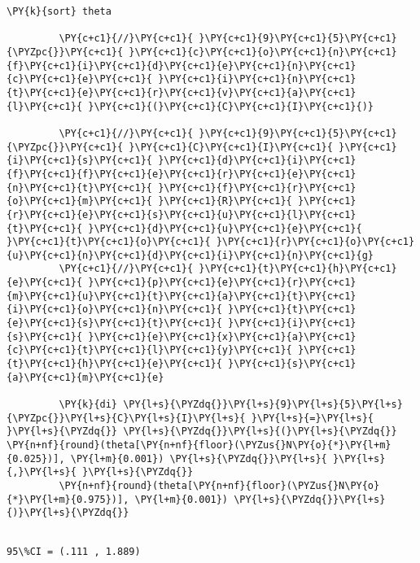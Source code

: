 \documentclass[11pt,notitlepage]{article}\usepackage[]{graphicx}\usepackage[]{color}
\makeatletter
\newenvironment{kframe}{%
 \def\at@end@of@kframe{}%
 \ifinner\ifhmode%
  \def\at@end@of@kframe{\end{minipage}}%
  \begin{minipage}{\columnwidth}%
 \fi\fi%
 \def\FrameCommand##1{\hskip\@totalleftmargin \hskip-\fboxsep
 \colorbox{shadecolor}{##1}\hskip-\fboxsep
     \hskip-\linewidth \hskip-\@totalleftmargin \hskip\columnwidth}%
 \MakeFramed {\advance\hsize-\width
   \@totalleftmargin\z@ \linewidth\hsize
   \@setminipage}}%
 {\par\unskip\endMakeFramed%
 \at@end@of@kframe}
\newenvironment{knitrout}{}{} %
\makeatother
\begin{document}
\begin{enumerate}[a)]
\begin{knitrout}
\begin{kframe}
\begin{Verbatim}[commandchars=\\\{\}]
         \PY{k}{sort} theta
         
         \PY{c+c1}{//}\PY{c+c1}{ }\PY{c+c1}{9}\PY{c+c1}{5}\PY{c+c1}{\PYZpc{}}\PY{c+c1}{ }\PY{c+c1}{c}\PY{c+c1}{o}\PY{c+c1}{n}\PY{c+c1}{f}\PY{c+c1}{i}\PY{c+c1}{d}\PY{c+c1}{e}\PY{c+c1}{n}\PY{c+c1}{c}\PY{c+c1}{e}\PY{c+c1}{ }\PY{c+c1}{i}\PY{c+c1}{n}\PY{c+c1}{t}\PY{c+c1}{e}\PY{c+c1}{r}\PY{c+c1}{v}\PY{c+c1}{a}\PY{c+c1}{l}\PY{c+c1}{ }\PY{c+c1}{(}\PY{c+c1}{C}\PY{c+c1}{I}\PY{c+c1}{)}
         
         \PY{c+c1}{//}\PY{c+c1}{ }\PY{c+c1}{9}\PY{c+c1}{5}\PY{c+c1}{\PYZpc{}}\PY{c+c1}{ }\PY{c+c1}{C}\PY{c+c1}{I}\PY{c+c1}{ }\PY{c+c1}{i}\PY{c+c1}{s}\PY{c+c1}{ }\PY{c+c1}{d}\PY{c+c1}{i}\PY{c+c1}{f}\PY{c+c1}{f}\PY{c+c1}{e}\PY{c+c1}{r}\PY{c+c1}{e}\PY{c+c1}{n}\PY{c+c1}{t}\PY{c+c1}{ }\PY{c+c1}{f}\PY{c+c1}{r}\PY{c+c1}{o}\PY{c+c1}{m}\PY{c+c1}{ }\PY{c+c1}{R}\PY{c+c1}{ }\PY{c+c1}{r}\PY{c+c1}{e}\PY{c+c1}{s}\PY{c+c1}{u}\PY{c+c1}{l}\PY{c+c1}{t}\PY{c+c1}{ }\PY{c+c1}{d}\PY{c+c1}{u}\PY{c+c1}{e}\PY{c+c1}{ }\PY{c+c1}{t}\PY{c+c1}{o}\PY{c+c1}{ }\PY{c+c1}{r}\PY{c+c1}{o}\PY{c+c1}{u}\PY{c+c1}{n}\PY{c+c1}{d}\PY{c+c1}{i}\PY{c+c1}{n}\PY{c+c1}{g}
         \PY{c+c1}{//}\PY{c+c1}{ }\PY{c+c1}{t}\PY{c+c1}{h}\PY{c+c1}{e}\PY{c+c1}{ }\PY{c+c1}{p}\PY{c+c1}{e}\PY{c+c1}{r}\PY{c+c1}{m}\PY{c+c1}{u}\PY{c+c1}{t}\PY{c+c1}{a}\PY{c+c1}{t}\PY{c+c1}{i}\PY{c+c1}{o}\PY{c+c1}{n}\PY{c+c1}{ }\PY{c+c1}{t}\PY{c+c1}{e}\PY{c+c1}{s}\PY{c+c1}{t}\PY{c+c1}{ }\PY{c+c1}{i}\PY{c+c1}{s}\PY{c+c1}{ }\PY{c+c1}{e}\PY{c+c1}{x}\PY{c+c1}{a}\PY{c+c1}{c}\PY{c+c1}{t}\PY{c+c1}{l}\PY{c+c1}{y}\PY{c+c1}{ }\PY{c+c1}{t}\PY{c+c1}{h}\PY{c+c1}{e}\PY{c+c1}{ }\PY{c+c1}{s}\PY{c+c1}{a}\PY{c+c1}{m}\PY{c+c1}{e}
         
         \PY{k}{di} \PY{l+s}{\PYZdq{}}\PY{l+s}{9}\PY{l+s}{5}\PY{l+s}{\PYZpc{}}\PY{l+s}{C}\PY{l+s}{I}\PY{l+s}{ }\PY{l+s}{=}\PY{l+s}{ }\PY{l+s}{\PYZdq{}} \PY{l+s}{\PYZdq{}}\PY{l+s}{(}\PY{l+s}{\PYZdq{}} \PY{n+nf}{round}(theta[\PY{n+nf}{floor}(\PYZus{}N\PY{o}{*}\PY{l+m}{0.025})], \PY{l+m}{0.001}) \PY{l+s}{\PYZdq{}}\PY{l+s}{ }\PY{l+s}{,}\PY{l+s}{ }\PY{l+s}{\PYZdq{}} 
         \PY{n+nf}{round}(theta[\PY{n+nf}{floor}(\PYZus{}N\PY{o}{*}\PY{l+m}{0.975})], \PY{l+m}{0.001}) \PY{l+s}{\PYZdq{}}\PY{l+s}{)}\PY{l+s}{\PYZdq{}}
\end{Verbatim}

    \begin{Verbatim}[commandchars=\\\{\}]

95\%CI = (.111 , 1.889)

    \end{Verbatim}
\end{kframe}
\end{knitrout}


\end{enumerate}
\end{document}
